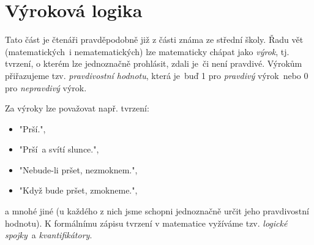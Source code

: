 \section{Výroková logika}\label{sec:vyrokova_logika}

Tato část je čtenáři pravděpodobně již z části známa ze střední školy. Řadu vět (matematických~i nematematických) lze matematicky chápat jako \emph{výrok}, tj. tvrzení, o kterém lze jednoznačně prohlásit, zdali je~či není pravdivé. Výrokům přiřazujeme tzv. \emph{pravdivostní hodnotu}, která je~buď 1 pro \emph{pravdivý} výrok~nebo 0 pro \emph{nepravdivý} výrok.\par
Za výroky lze považovat např. tvrzení:
\begin{itemize}
    \item "Prší.",
    \item "Prší~a svítí slunce.",
    \item "Nebude-li pršet, nezmoknem.",
    \item "Když bude pršet, zmokneme.",
\end{itemize}
a mnohé jiné (u každého z nich jsme schopni jednoznačně určit jeho pravdivostní hodnotu). K formálnímu zápisu tvrzení v matematice vyžíváme tzv. \emph{logické spojky}~a \emph{kvantifikátory}.

